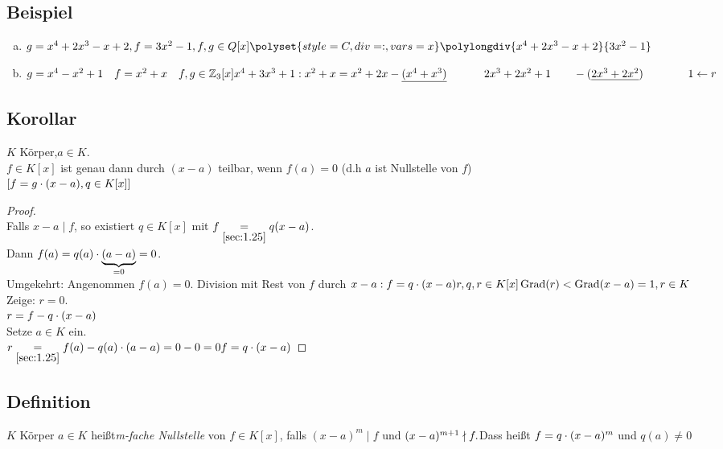 \subsection{Beispiel}\label{sec:1.28}
\begin{enumerate}[a)]
\item $g = x^4 + 2x^3 - x +2, f = 3x^2 - 1, f,g \in Q[x]\\
\polyset{style=C, div=:,vars=x}
    \polylongdiv{x^4+2x^3-x+2}{3x^2 - 1}$
\item $g = x^4 - x^2 + 1\quad f = x^2 + x\quad f,g \in \mathbb{Z}_3[x]\\
x^4 + 3x^3 + 1 : x^2 + x = x^2 + 2 x\\
-\underline{(x^4 + x^3)}\\
\phantom{ }\qquad\phantom{-(}\,2x^3 + 2x^2 + 1\\
\phantom{ }\qquad-(\underline{2x^3 + 2x^2})\\
\phantom{ }\qquad\qquad 1 \leftarrow r$
\end{enumerate}
\subsection{Korollar}\label{sec:1.29}
$K$ Körper,$a \in K$.\\
$f \in K[x]$ ist genau dann durch $(x-a)$ teilbar, wenn $f(a) =0$ (d.h $a$ ist Nullstelle von $f$)\\
$[f = g \cdot (x-a), q \in K[x]]$
\begin{proof}\ \\
Falls $x -a \mid f$, so existiert $q \in K[x]$ mit $f \underset{\ref{sec:1.25}}{=} q (x-a)$.\\ Dann $f(a) = q(a) \cdot \underbrace{(a-a)}_{= 0} = 0$.\\
Umgekehrt: Angenommen $f(a)=0$. Division mit Rest von $f$ durch $x-a:\\
f = q \cdot (x-a)  r, q,r\in K[x]\\
\operatorname{Grad}(r) < \operatorname{Grad}(x-a) = 1, r \in K$\\
Zeige: $r=0$.\\
$r = f - q \cdot (x-a)$\\
Setze $a \in K$ ein.\\
$r \underset{\ref{sec:1.25}}{=} f(a) - q(a) \cdot (a-a) = 0 - 0 = 0\\
f = q \cdot (x-a)$
\end{proof}
\subsection{Definition}\label{sec:1.30}
$K$ Körper $a \in K$ hei\ss t\emph{m-fache Nullstelle} von $f \in K[x]$, falls $(x-a)^m \mid f$ und $(x-a)^{m+1} \nmid f.\\
$Dass hei\ss t $f = q \cdot (x-a)^m$ und $q(a) \ne 0$
